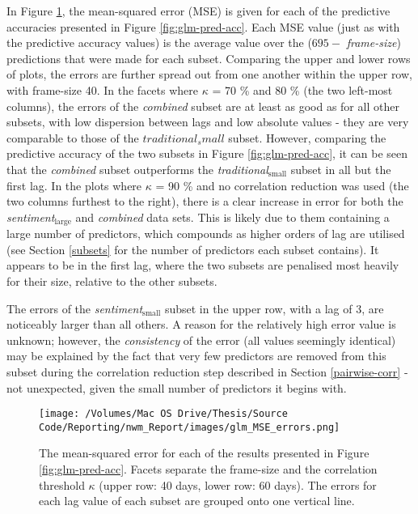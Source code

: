 \documentclass{article}
\begin{document}
In Figure \ref{fig:glm-errors}, the mean-squared error (MSE) is given for each of the predictive accuracies presented in Figure \ref{fig:glm-pred-acc}. Each MSE value (just as with the predictive accuracy values) is the average value over the ($695 -$ \emph{frame-size}) predictions that were made for each subset. Comparing the upper and lower rows of plots, the errors are further spread out from one another within the upper row, with frame-size 40. In the facets where $\kappa$ = 70 \% and 80 \% (the two left-most columns), the errors of the \emph{combined} subset are at least as good as for all other subsets, with low dispersion between lags and low absolute values - they are very comparable to those of the $traditional_small$ subset. However, comparing the predictive accuracy of the two subsets in Figure \ref{fig:glm-pred-acc}, it can be seen that the \emph{combined} subset outperforms the \emph{traditional$_{\text{small}}$} subset in all but the first lag. In the plots where $\kappa$ = 90 \% and no correlation reduction was used (the two columns furthest to the right), there is a clear increase in error for both the \emph{sentiment$_{\text{large}}$} and \emph{combined} data sets. This is likely due to them containing a large number of predictors, which compounds as higher orders of lag are utilised (see Section \ref{subsets} for the number of predictors each subset contains). It appears to be in the first lag, where the two subsets are penalised most heavily for their size, relative to the other subsets. 

The errors of the \emph{sentiment$_{\text{small}}$} subset in the upper row, with a lag of 3, are noticeably larger than all others. A reason for the relatively high error value is unknown; however, the \emph{consistency} of the error (all values seemingly identical) may be explained by the fact that very few predictors are removed from this subset during the correlation reduction step described in Section \ref{pairwise-corr} - not unexpected, given the small number of predictors it begins with.

\begin{figure}[htb]
\centering
\texttt{[image: /Volumes/Mac OS Drive/Thesis/Source Code/Reporting/nwm\_Report/images/glm\_MSE\_errors.png]}
\caption[The mean-suared error of all subsets, using Gaussian regression in GLMs]{\label{fig:glm-errors}The mean-squared error for each of the results presented in Figure \ref{fig:glm-pred-acc}. Facets separate the frame-size and the correlation threshold $\kappa$ (upper row: 40 days, lower row: 60 days). The errors for each lag value of each subset are grouped onto one vertical line.}
\end{figure}
\end{document}
